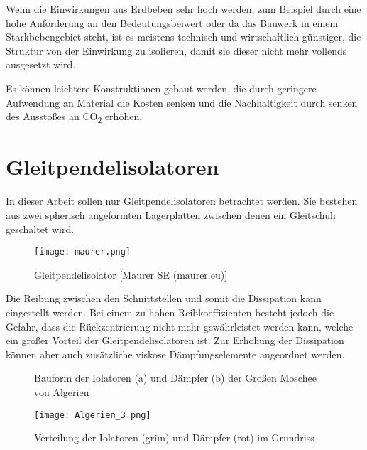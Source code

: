 Wenn die Einwirkungen aus Erdbeben sehr hoch werden, zum Beispiel durch eine hohe Anforderung an den Bedeutungsbeiwert oder da das Bauwerk in einem Starkbebengebiet steht, ist es meistens technisch und wirtschaftlich günstiger, die Struktur von der Einwirkung zu isolieren, damit sie dieser nicht mehr vollends ausgesetzt wird.

Es können leichtere Konstruktionen gebaut werden, die durch geringere Aufwendung an Material die Kosten senken und die Nachhaltigkeit durch senken des Ausstoßes an CO\textsubscript{2} erhöhen.

\section{Gleitpendelisolatoren}
\label{sec:gleitisolatoren}

In dieser Arbeit sollen nur Gleitpendelisolatoren betrachtet werden. Sie bestehen aus zwei spherisch angeformten Lagerplatten zwischen denen ein Gleitschuh geschaltet wird.

\begin{figure}[H]
    \centering
    \texttt{[image: maurer.png]}
    \caption{Gleitpendelisolator [Maurer SE (maurer.eu)]}
\end{figure}

Die Reibung zwischen den Schnittstellen und somit die Dissipation kann eingestellt werden.
Bei einem zu hohen Reibkoeffizienten besteht jedoch die Gefahr, dass die Rückzentrierung nicht mehr gewährleistet werden kann, welche ein großer Vorteil der Gleitpendelisolatoren ist.
Zur Erhöhung der Dissipation können aber auch zusätzliche viskose Dämpfungselemente angeordnet werden.

\begin{figure}%
    \centering
    \qquad
    \caption{Bauform der Iolatoren (a) und Dämpfer (b) der Großen Moschee von Algerien \cite{AKK}}%
\end{figure}

\begin{figure}
    \centering
    \texttt{[image: Algerien\_3.png]}
    \caption{Verteilung der Iolatoren (grün) und Dämpfer (rot) im Grundriss \cite{AKK}}
\end{figure}

\pagebreak

